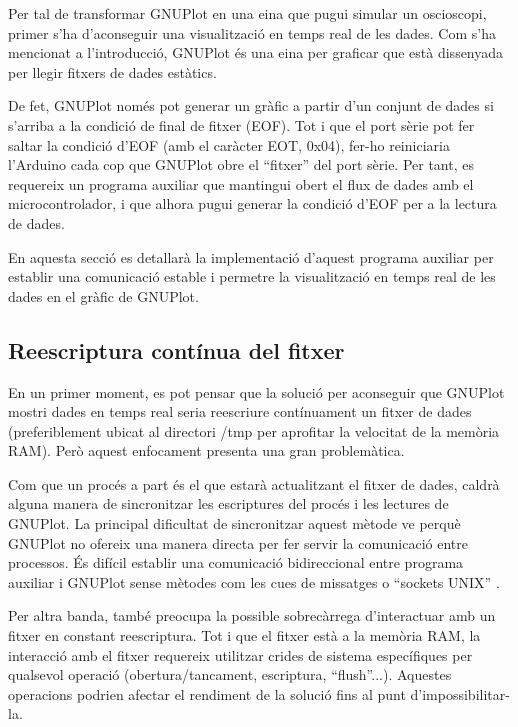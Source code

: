 \documentclass{tfgitic}[2023/06/30]
\begin{document}
Per tal de transformar GNUPlot en una eina que pugui simular un
osci\lgem oscopi, primer s'ha d'aconseguir una visualització en temps
real de les dades. Com s'ha mencionat a l'introducció, GNUPlot és una
eina per graficar que està dissenyada per llegir fitxers de dades
estàtics.

De fet, GNUPlot només pot generar un gràfic a partir d'un conjunt de
dades si s'arriba a la condició de final de fitxer (EOF). Tot i que el
port sèrie pot fer saltar la condició d'EOF (amb el caràcter EOT,
0x04), fer-ho reiniciaria l'Arduino cada cop que GNUPlot obre el
``fitxer'' del port sèrie. Per tant, es requereix un programa auxiliar
que mantingui obert el flux de dades amb el microcontrolador, i que
alhora pugui generar la condició d'EOF per a la lectura de dades.

En aquesta secció es detallarà la implementació d'aquest programa
auxiliar per establir una comunicació estable i permetre la
visualització en temps real de les dades en el gràfic de GNUPlot.

\subsection{Reescriptura contínua del fitxer}

En un primer moment, es pot pensar que la solució per aconseguir que
GNUPlot mostri dades en temps real seria reescriure contínuament un
fitxer de dades (preferiblement ubicat al directori /tmp per aprofitar
la velocitat de la memòria RAM). Però aquest enfocament presenta una
gran problemàtica.

Com que un procés a part és el que estarà actualitzant el fitxer de
dades, caldrà alguna manera de sincronitzar les escriptures del procés
i les lectures de GNUPlot. La principal dificultat de sincronitzar
aquest mètode ve perquè GNUPlot no ofereix una manera directa per fer
servir la comunicació entre processos. És difícil establir una
comunicació bidireccional entre programa auxiliar i GNUPlot sense
mètodes com les cues de missatges \cite{cues-missatges} o ``sockets
UNIX'' \cite{sockets-unix}.

Per altra banda, també preocupa la possible sobrecàrrega d'interactuar
amb un fitxer en constant reescriptura. Tot i que el fitxer està a la
memòria RAM, la interacció amb el fitxer requereix utilitzar crides de
sistema específiques per qualsevol operació (obertura/tancament,
escriptura, ``flush''...). Aquestes operacions podrien afectar el
rendiment de la solució fins al punt d'impossibilitar-la.
\end{document}
